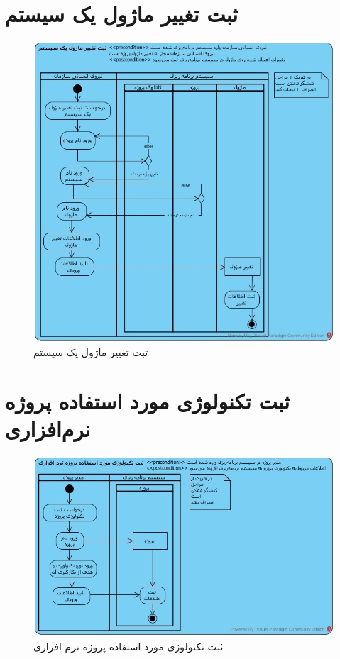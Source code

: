 \section{ثبت تغییر ماژول یک سیستم}
\begin{figure}[H]
	\centering
	\includegraphics[scale=0.6]{img/activity/AddModuleModification}
	\caption{ثبت تغییر ماژول یک سیستم}
\end{figure}


\section{ثبت تکنولوژی مورد استفاده پروژه نرم‌افزاری}
\begin{figure}[H]
	\centering
	\includegraphics[scale=0.7]{img/activity/AddTechnology}
	\caption{ثبت تکنولوژی مورد استفاده پروژه نرم افزاری}
\end{figure}

